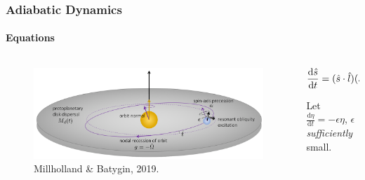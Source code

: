 \documentclass[dvipsnames]{beamer}
\newcommand*{\rd}[2]{\frac{\mathrm{d}#1}{\mathrm{d}#2}}
\DeclarePairedDelimiter\p{\lparen}{\rparen}
\begin{document}
\begin{frame}
    \frametitle{Adiabatic Dynamics}
    \framesubtitle{Equations}

    \begin{columns}
        \begin{column}{0.5\textwidth}
            \begin{figure}[t]
                \centering
                \includegraphics[width=\textwidth]{../GM_190913/1millholland_disk.png}
                \caption{Millholland \& Batygin, 2019.}
            \end{figure}
        \end{column}
        \begin{column}{0.5\textwidth}
            \begin{equation*}
                \rd{\hat{s}}{t}
                    = \p{\hat{s} \cdot \hat{l}}
                        \p{\hat{s} \times \hat{l}}
                    - \eta\p{\hat{s} \times \hat{l}_d}.
            \end{equation*}

            Let $\rd{\eta}{t} = -\epsilon \eta$, $\epsilon$ \emph{sufficiently}
            small.
        \end{column}
    \end{columns}
\end{frame}
\end{document}
